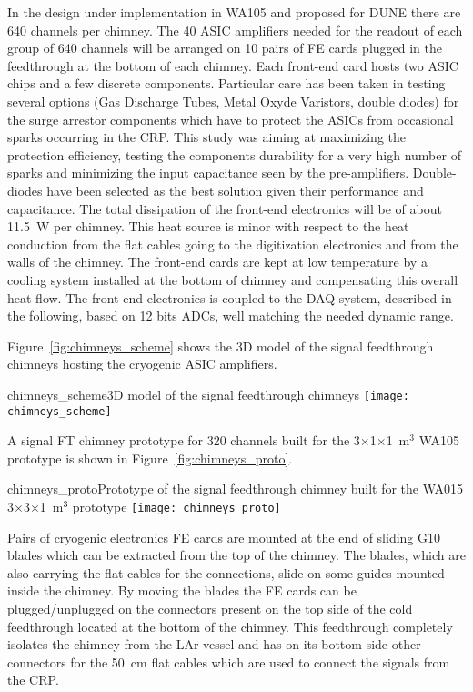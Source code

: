 In the design under implementation in WA105 and proposed for DUNE
there are 640 channels per chimney. The 40 ASIC amplifiers needed for
the readout of each group of 640 channels will be arranged on 10 pairs
of FE cards plugged in the feedthrough at the bottom of each chimney.
Each front-end card hosts two ASIC chips and a few discrete
components. Particular care has been taken in testing several options
(Gas Discharge Tubes, Metal Oxyde Varistors, double diodes) for the
surge arrestor components which have to protect the ASICs from
occasional sparks occurring in the CRP.  This study was aiming at
maximizing the protection efficiency, testing the components
durability for a very high number of sparks and minimizing the input
capacitance seen by the pre-amplifiers. Double-diodes have been
selected as the best solution given their performance and
capacitance. The total dissipation of the front-end electronics will
be of about 11.5~W per chimney. This heat source is minor with respect
to the heat conduction from the flat cables going to the digitization
electronics and from the walls of the chimney. The front-end cards are
kept at low temperature by a cooling system installed at the bottom of
chimney and compensating this overall heat flow. The front-end
electronics is coupled to the DAQ system, described in the following,
based on 12 bits ADCs, well matching the needed dynamic range.

Figure~\ref{fig:chimneys_scheme} shows the 3D model of the signal
feedthrough chimneys hosting the cryogenic ASIC amplifiers.
\begin{cdrfigure}
{chimneys_scheme}{3D model of the signal feedthrough chimneys}
\texttt{[image: chimneys\_scheme]}
\end{cdrfigure}
A signal FT chimney prototype for 320 channels built for the
3$\times$1$\times$1~m$^3$ WA105 prototype is shown in
Figure~\ref{fig:chimneys_proto}.
\begin{cdrfigure}
{chimneys_proto}{Prototype of the signal feedthrough chimney built 
for the WA015 3$\times$3$\times$1~m$^3$ prototype}
\texttt{[image: chimneys\_proto]}
\end{cdrfigure}
Pairs of cryogenic electronics FE cards are mounted at the end of
sliding G10 blades which can be extracted from the top of the
chimney. The blades, which are also carrying the flat cables for the
connections, slide on some guides mounted inside the chimney. By
moving the blades the FE cards can be plugged/unplugged on the
connectors present on the top side of the cold feedthrough located at
the bottom of the chimney. This feedthrough completely isolates the
chimney from the LAr vessel and has on its bottom side other
connectors for the 50~cm flat cables which are used to connect the
signals from the CRP.


